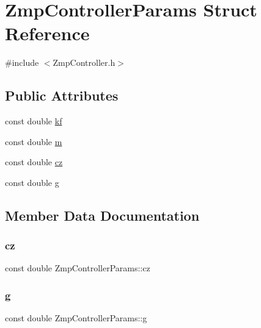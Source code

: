 \hypertarget{structZmpControllerParams}{}\section{Zmp\+Controller\+Params Struct Reference}
\label{structZmpControllerParams}


{\ttfamily \#include $<$Zmp\+Controller.\+h$>$}

\subsection*{Public Attributes}
\begin{DoxyCompactItemize}
\item 
const double \hyperlink{structZmpControllerParams_a6138cbf819799519abd3864bd8bf05cf}{kf}
\item 
const double \hyperlink{structZmpControllerParams_a1a3eea24e276953f2e74c4066b24106c}{m}
\item 
const double \hyperlink{structZmpControllerParams_ae0d24b7bdae3eb228b9db827934d0e87}{cz}
\item 
const double \hyperlink{structZmpControllerParams_af97a6bcc6b60e8372dd444d695d705f7}{g}
\end{DoxyCompactItemize}


\subsection{Member Data Documentation}
\hypertarget{structZmpControllerParams_ae0d24b7bdae3eb228b9db827934d0e87}{}\label{structZmpControllerParams_ae0d24b7bdae3eb228b9db827934d0e87} 
\subsubsection{\texorpdfstring{cz}{cz}}
{\footnotesize\ttfamily const double Zmp\+Controller\+Params\+::cz}

\hypertarget{structZmpControllerParams_af97a6bcc6b60e8372dd444d695d705f7}{}\label{structZmpControllerParams_af97a6bcc6b60e8372dd444d695d705f7} 
\subsubsection{\texorpdfstring{g}{g}}
{\footnotesize\ttfamily const double Zmp\+Controller\+Params\+::g}

